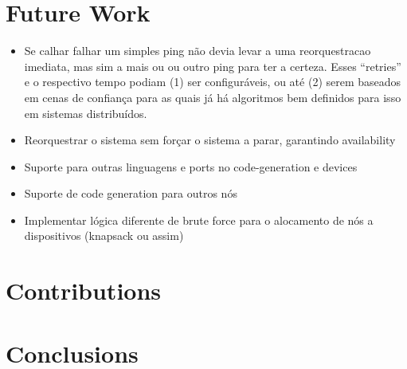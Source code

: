 \section{Future Work}\label{sec:future_work}
\begin{itemize}
    \item Se calhar falhar um simples ping não devia levar a uma reorquestracao imediata, mas sim a mais ou ou outro ping para ter a certeza. Esses “retries” e o respectivo tempo podiam (1) ser configuráveis, ou até (2) serem baseados em cenas de confiança para as quais já há algoritmos bem definidos para isso em sistemas distribuídos.
    \item Reorquestrar o sistema sem forçar o sistema a parar, garantindo availability
    \item Suporte para outras linguagens e ports no code-generation e devices
    \item Suporte de code generation para outros nós
    \item Implementar lógica diferente de brute force para o alocamento de nós a dispositivos (knapsack ou assim)
\end{itemize}


\section{Contributions}

\section{Conclusions}